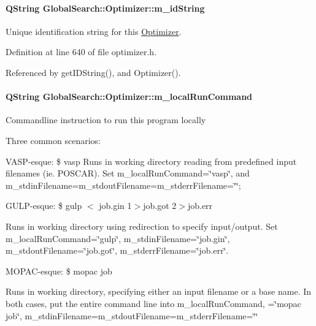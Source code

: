 \paragraph[{m\+\_\+id\+String}]{\setlength{\rightskip}{0pt plus 5cm}Q\+String Global\+Search\+::\+Optimizer\+::m\+\_\+id\+String\hspace{0.3cm}{\ttfamily [protected]}}\label{classGlobalSearch_1_1Optimizer_a4d2dc8b7aaa3bb6fed8c28547460def8}
Unique identification string for this \hyperlink{classGlobalSearch_1_1Optimizer}{Optimizer}. 

Definition at line 640 of file optimizer.\+h.



Referenced by get\+I\+D\+String(), and Optimizer().

\hypertarget{classGlobalSearch_1_1Optimizer_a1cdb6b6c5e929e84c834ba93148fb31e}{}
\paragraph[{m\+\_\+local\+Run\+Command}]{\setlength{\rightskip}{0pt plus 5cm}Q\+String Global\+Search\+::\+Optimizer\+::m\+\_\+local\+Run\+Command\hspace{0.3cm}{\ttfamily [protected]}}\label{classGlobalSearch_1_1Optimizer_a1cdb6b6c5e929e84c834ba93148fb31e}
Commandline instruction to run this program locally

Three common scenarios\+:

V\+A\+S\+P-\/esque\+: \$ vasp Runs in working directory reading from predefined input filenames (ie. P\+O\+S\+C\+A\+R). Set m\+\_\+local\+Run\+Command=\char`\"{}vasp\char`\"{}, and m\+\_\+stdin\+Filename=m\+\_\+stdout\+Filename=m\+\_\+stderr\+Filename=\char`\"{}\char`\"{};

G\+U\+L\+P-\/esque\+: \$ gulp $<$ job.\+gin 1$>$job.\+got 2$>$job.\+err

Runs in working directory using redirection to specify input/output. Set m\+\_\+local\+Run\+Command=\char`\"{}gulp\char`\"{}, m\+\_\+stdin\+Filename=\char`\"{}job.\+gin\char`\"{}, m\+\_\+stdout\+Filename=\char`\"{}job.\+got\char`\"{}, m\+\_\+stderr\+Filename=\char`\"{}job.\+err\char`\"{}.

M\+O\+P\+A\+C-\/esque\+: \$ mopac job

Runs in working directory, specifying either an input filename or a base name. In both cases, put the entire command line into m\+\_\+local\+Run\+Command, =\char`\"{}mopac job\char`\"{}, m\+\_\+stdin\+Filename=m\+\_\+stdout\+Filename=m\+\_\+stderr\+Filename=\char`\"{}\char`\"{}

